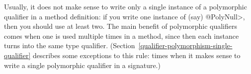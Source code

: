 %
%
%
%
%
%




Usually, it does not make sense to write only a single instance of a polymorphic
qualifier in a method definition:  if you write one instance of (say)
\<@PolyNull>, then you should use at least two.
The main benefit of polymorphic qualifiers comes when one is used multiple times
in a method, since then each instance turns into the same type qualifier.
(Section~\ref{qualifier-polymorphism-single-qualifier} describes some
exceptions to this rule:  times when it makes sense to write a single
polymorphic qualifier in a signature.)


